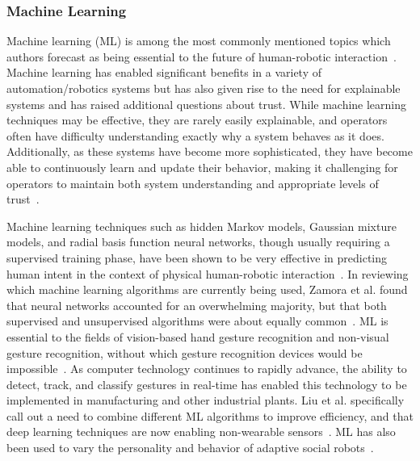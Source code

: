 \subsubsection{Machine Learning}
Machine learning (ML) is among the most commonly mentioned topics which authors forecast as being essential to the future of human-robotic interaction~\citep{wang_current_2018}.
Machine learning has enabled significant benefits in a variety of automation/robotics systems but has also given rise to the need for explainable systems and has raised additional questions about trust.
While machine learning techniques may be effective, they are rarely easily explainable, and operators often have difficulty understanding exactly why a system behaves as it does.
Additionally, as these systems have become more sophisticated, they have become able to continuously learn and update their behavior, making it challenging for operators to maintain both system understanding and appropriate levels of trust~\citep{chen_humanagent_2014}.

Machine learning techniques such as hidden Markov models, Gaussian mixture models, and radial basis function neural networks, though usually requiring a supervised training phase, have been shown to be very effective in predicting human intent in the context of physical human-robotic interaction~\citep{losey_review_2018}.
In reviewing which machine learning algorithms are currently being used, Zamora et al. found that neural networks accounted for an overwhelming majority, but that both supervised and unsupervised algorithms were about equally common~\citep{zamora_machine_2017}.
ML is essential to the fields of vision-based hand gesture recognition and non-visual gesture recognition, without which gesture recognition devices would be impossible~\citep{liu_gesture_2018, rautaray_vision_2015, 8701742}.
As computer technology continues to rapidly advance, the ability to detect, track, and classify gestures in real-time has enabled this technology to be implemented in manufacturing and other industrial plants.
Liu et al. specifically call out a need to combine different ML algorithms to improve efficiency, and that deep learning techniques are now enabling non-wearable sensors~\citep{liu_gesture_2018}.
ML has also been used to vary the personality and behavior of adaptive social robots~\citep{ahmad_systematic_2017}.

